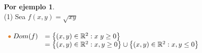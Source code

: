 \documentclass{article}
\theoremstyle{definition}
\newtheorem*{ej}{Por ejemplo}
\theoremstyle{remark}
\begin{document}
\pagebreak 
\begin{ej}
  \; \\
  \textcolor{verdep2}{(1)} Sea $f(x,y)=\sqrt{xy}$ \quad {} \\\\
 $\begin{array}{ll}
   \textcolor{rojop2}{\bullet}\;  Dom(f) & =\big\{(x,y) \in \mathbb{R}^2 : x\phantom{,}y \geq 0 \big\} \\ 
           & = \big\{(x,y) \in \mathbb{R}^2 : x,y \geq 0 \big\} \cup \big\{(x,y) \in \mathbb{R}^2 : x,y \leq 0 \big\}
  \end{array}$
\end{ej}
\begin{figure}[h]
\centering
\def\svgwidth{0.55\textwidth}

\end{figure} \; \\
\end{document}
